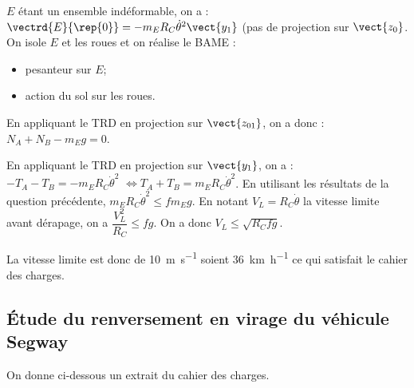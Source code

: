\ifnormal
{}%
\else
\fi
\ifprof
\begin{corrige}
$E$ étant un ensemble indéformable, on a : $\vectrd{E}{\rep{0}}=-m_E R_C\dot{\theta}^2\vect{y_1}$ (pas de projection sur $\vect{z_0}$. 
On isole $E$ et les roues  et on réalise le BAME : 
\begin{itemize}
\item pesanteur sur $E$;
\item action du sol sur les roues.
\end{itemize}

En appliquant le TRD en projection sur $\vect{z_{01}}$, on a donc :
$N_A+N_B-m_E g = 0$. 


\end{corrige}
\else
\fi

\ifnormal
{}
\else
\fi

\ifprof

\begin{corrige}
En appliquant le TRD en projection sur $\vect{y_{1}}$, on a : $-T_A-T_B = -m_E R_C\dot{\theta}^2$ $\Leftrightarrow T_A+T_B = m_E R_C\dot{\theta}^2$. En utilisant les résultats de la question précédente, $m_E R_C\dot{\theta}^2 \leq fm_E g $. En notant $V_L=R_C\dot{\theta}$ la vitesse limite avant dérapage, on a $ \dfrac{V_L^2}{R_C} \leq f  g $.
On a donc $V_L \leq \sqrt{R_Cfg}$.
\end{corrige}
\else
\fi

\ifnormal
{}
\else
\fi
\ifprof
\begin{corrige}
La vitesse limite est donc de \SI{10}{m.s^{-1}} soient \SI{36}{km.h^{-1}} ce qui satisfait le cahier des charges. 
\end{corrige}
\else
\fi

\iftdifficile
{}

\else
\fi


\subsection*{Étude du renversement en virage du véhicule Segway}
\ifprof
\else
On donne ci-dessous un extrait du cahier des charges.


